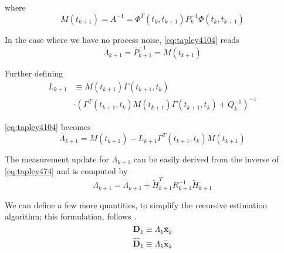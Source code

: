 where
\begin{equation}
  \label{eq:tapley4105}
  M(t_{k+1}) = A^{-1} = \Phi ^T (t_k, t_{k+1} ) P^{-1}_k \Phi (t_k, t_{k+1} )
\end{equation}

In the case where we have no process noise, \ref{eq:tapley4104} reads
\begin{equation}
  \bar{\Lambda}_{k+1} = \bar{P}^{-1}_{k+1} = M(t_{k+1})
\end{equation}

Further defining
\begin{equation}
  \label{eq:tapley4106}
  \begin{split}
  L_{k+1} & \equiv M(t_{k+1}) \Gamma (t_{k+1}, t_k ) \\
          & \cdot \left( \Gamma ^T (t_{k+1}, t_k ) M(t_{k+1}) \Gamma (t_{k+1}, t_k ) + Q^{-1}_k \right) ^{-1}
  \end{split}
\end{equation}

\ref{eq:tapley4104} becomes
\begin{equation}
  \label{eq:tapley4107}
  \bar{\Lambda}_{k+1} =  M(t_{k+1}) - L_{k+1} \Gamma ^T (t_{k+1}, t_k ) M(t_{k+1})
\end{equation}

The measurement update for \(\Lambda _{k+1}\) can be easily derived from the inverse 
of \ref{eq:tapley474} and is computed by
\begin{equation}
  \label{eq:tapley4108}
  \Lambda _{k+1} = \bar{\Lambda}_{k+1} + \tilde{H}^T_{k+1} R^{-1}_{k+1} \tilde{H}_{k+1}
\end{equation}

We can define a few more quantities, to simplify the recursive estimation algorithm; 
this formulation, follows \cite{tapley}.
\begin{subequations}
  \begin{align}
    \label{eq:tapley4109}
    \bar{\bm{D}}_k \equiv \bar{\Lambda}_k \bar{\bm{x}}_k \\
    \label{eq:tapley41010}
    \hat{\bm{D}}_k \equiv \Lambda _k \hat{\bm{x}}_k
  \end{align}
\end{subequations}

